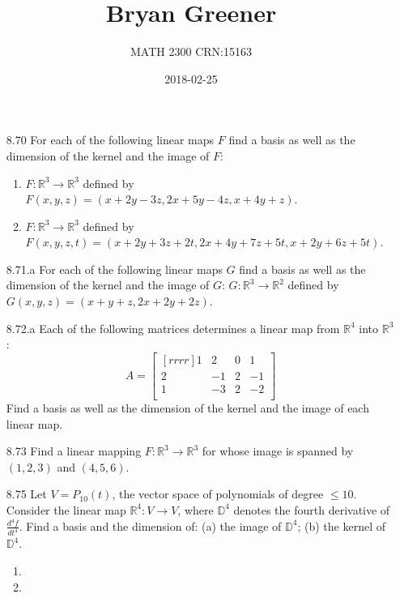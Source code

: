 \documentclass[12pt]{article}
\title{Bryan Greener}
\author{MATH 2300 CRN:15163}
\date{2018-02-25}
\theoremstyle{definition}
\theoremstyle{plain}
\begin{document}
\maketitle

\TabPositions{4cm}

\begin{enumerate}
\item[8.70] For each of the following linear maps $F$ find a basis as well as the dimension of the kernel and the image of $F$:
	\begin{enumerate}
	\item $F:\mathbb{R}^3\rightarrow\mathbb{R}^3$ defined by $F(x,y,z)=(x+2y-3z,2x+5y-4z,x+4y+z)$.
	\item $F:\mathbb{R}^3\rightarrow\mathbb{R}^3$ defined by $F(x,y,z,t)=(x+2y+3z+2t,2x+4y+7z+5t,x+2y+6z+5t)$.
	\end{enumerate}

\item[8.71.a] For each of the following linear maps $G$ find a basis as well as the dimension of the kernel and the image of $G$: $G:\mathbb{R}^3\rightarrow\mathbb{R}^2$ defined by $G(x,y,z)=(x+y+z,2x+2y+2z)$.

\item[8.72.a] Each of the following matrices determines a linear map from $\mathbb{R}^4$ into $\mathbb{R}^3$:\\
	\[ A=\begin{bmatrix}[rrrr]1&2&0&1\\2&-1&2&-1\\1&-3&2&-2\\\end{bmatrix} \]
	Find a basis as well as the dimension of the kernel and the image of each linear map.

\item[8.73] Find a linear mapping $F:\mathbb{R}^3\rightarrow\mathbb{R}^3$ for whose image is spanned by $(1,2,3)$ and $(4,5,6)$.

\item[8.75] Let $V=P_{10}(t)$, the vector space of polynomials of degree $\leq 10$. Consider the linear map $\mathbb{R}^4: V\rightarrow V$, where $\mathbb{D}^4$ denotes the fourth derivative of $\frac{d^4f}{dt^4}$. Find a basis and the dimension of: (a) the image of $\mathbb{D}^4$; (b) the kernel of $\mathbb{D}^4$.
	\begin{enumerate}
	\item
	\item
	\end{enumerate}		


\end{enumerate}
\end{document}
